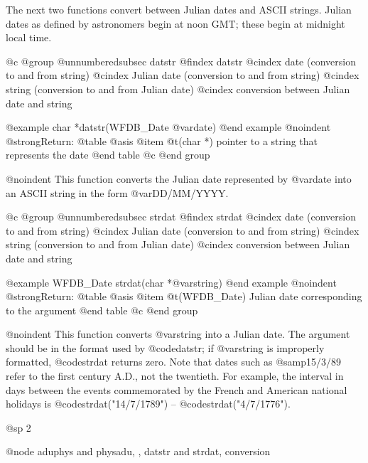 {{{{{{{{The next two functions convert between Julian dates and ASCII strings.
Julian dates as defined by astronomers begin at noon GMT; these begin at
midnight local time.

@c @group
@unnumberedsubsec datstr
@findex datstr
@cindex date (conversion to and from string)
@cindex Julian date (conversion to and from string)
@cindex string (conversion to and from Julian date)
@cindex conversion between Julian date and string

@example
char *datstr(WFDB_Date @var{date})
@end example
@noindent
@strong{Return:}
@table @asis
@item @t{(char *)}
pointer to a string that represents the date
@end table
@c @end group

@noindent
This function converts the Julian date represented by @var{date} into
an ASCII string in the form @var{DD/MM/YYYY}.

@c @group
@unnumberedsubsec strdat
@findex strdat
@cindex date (conversion to and from string)
@cindex Julian date (conversion to and from string)
@cindex string (conversion to and from Julian date)
@cindex conversion between Julian date and string

@example
WFDB_Date strdat(char *@var{string})
@end example
@noindent
@strong{Return:}
@table @asis
@item @t{(WFDB_Date)}
Julian date corresponding to the argument
@end table
@c @end group

@noindent
This function converts @var{string} into a Julian date.  The argument
should be in the format used by @code{datstr}; if @var{string} is
improperly formatted, @code{strdat} returns zero.  Note that dates such
as @samp{15/3/89} refer to the first century A.D., not the twentieth.
For example, the interval in days between the events commemorated by the
French and American national holidays is @code{strdat("14/7/1789")} --
@code{strdat("4/7/1776")}.

@sp 2

@node aduphys and physadu, , datstr and strdat, conversion

}}}}}}}}
